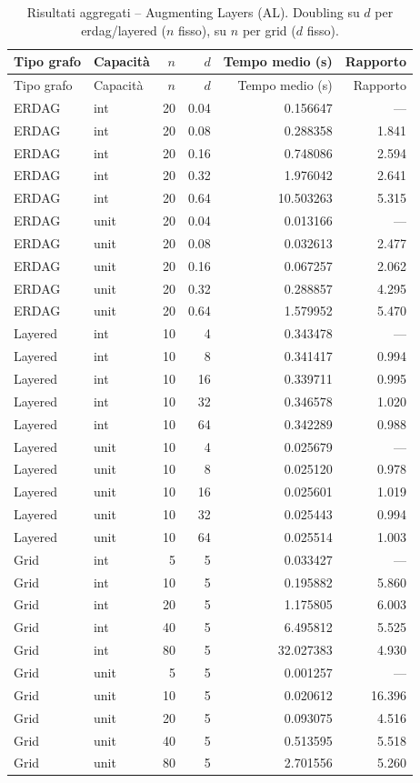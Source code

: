 \begin{longtable}{l l r r r r}
\caption{Risultati aggregati -- Augmenting Layers (AL). Doubling su $d$ per erdag/layered ($n$ fisso), su $n$ per grid ($d$ fisso).}
\label{tab:al_results} \\
\toprule
Tipo grafo & Capacit\`a & $n$ & $d$ & Tempo medio (s) & Rapporto \\
\midrule
\endfirsthead
\toprule
Tipo grafo & Capacit\`a & $n$ & $d$ & Tempo medio (s) & Rapporto \\
\midrule
\endhead
\bottomrule
\endfoot
ERDAG & int & 20 & 0.04 & 0.156647 & --- \\
ERDAG & int & 20 & 0.08 & 0.288358 & 1.841 \\
ERDAG & int & 20 & 0.16 & 0.748086 & 2.594 \\
ERDAG & int & 20 & 0.32 & 1.976042 & 2.641 \\
ERDAG & int & 20 & 0.64 & 10.503263 & 5.315 \\
\addlinespace
ERDAG & unit & 20 & 0.04 & 0.013166 & --- \\
ERDAG & unit & 20 & 0.08 & 0.032613 & 2.477 \\
ERDAG & unit & 20 & 0.16 & 0.067257 & 2.062 \\
ERDAG & unit & 20 & 0.32 & 0.288857 & 4.295 \\
ERDAG & unit & 20 & 0.64 & 1.579952 & 5.470 \\
\addlinespace
Layered & int & 10 & 4 & 0.343478 & --- \\
Layered & int & 10 & 8 & 0.341417 & 0.994 \\
Layered & int & 10 & 16 & 0.339711 & 0.995 \\
Layered & int & 10 & 32 & 0.346578 & 1.020 \\
Layered & int & 10 & 64 & 0.342289 & 0.988 \\
\addlinespace
Layered & unit & 10 & 4 & 0.025679 & --- \\
Layered & unit & 10 & 8 & 0.025120 & 0.978 \\
Layered & unit & 10 & 16 & 0.025601 & 1.019 \\
Layered & unit & 10 & 32 & 0.025443 & 0.994 \\
Layered & unit & 10 & 64 & 0.025514 & 1.003 \\
\addlinespace
Grid & int & 5 & 5 & 0.033427 & --- \\
Grid & int & 10 & 5 & 0.195882 & 5.860 \\
Grid & int & 20 & 5 & 1.175805 & 6.003 \\
Grid & int & 40 & 5 & 6.495812 & 5.525 \\
Grid & int & 80 & 5 & 32.027383 & 4.930 \\
\addlinespace
Grid & unit & 5 & 5 & 0.001257 & --- \\
Grid & unit & 10 & 5 & 0.020612 & 16.396 \\
Grid & unit & 20 & 5 & 0.093075 & 4.516 \\
Grid & unit & 40 & 5 & 0.513595 & 5.518 \\
Grid & unit & 80 & 5 & 2.701556 & 5.260 \\
\end{longtable}

